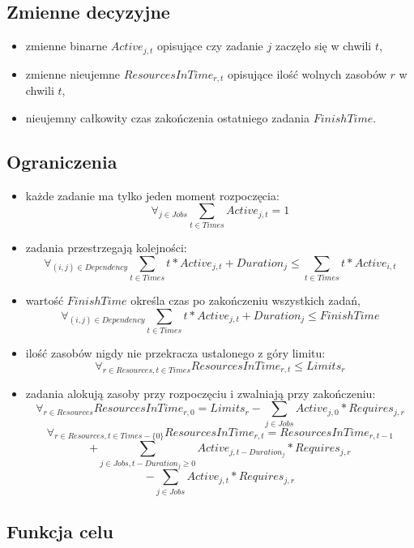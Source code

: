 \documentclass[polish,12pt,titlepage]{article}
\begin{document}
\subsection{Zmienne decyzyjne}

\begin{itemize}
	\item zmienne binarne $Active_{j,t}$ opisujące czy zadanie $j$ zaczęło się w chwili $t$,
	\item zmienne nieujemne $ResourcesInTime_{r,t}$ opisujące ilość wolnych zasobów $r$ w chwili $t$,
	\item nieujemny całkowity czas zakończenia ostatniego zadania $FinishTime$.
\end{itemize}

\subsection{Ograniczenia}

\begin{itemize}
	\item każde zadanie ma tylko jeden moment rozpoczęcia:
	$$\forall_{j \in Jobs} \sum\limits_{t \in Times} Active_{j,t} = 1$$
	\item zadania przestrzegają kolejności:
	$$\forall_{(i,j) \in Dependency} \sum\limits_{t \in Times} t*Active_{j,t}  + Duration_j \leq \sum\limits_{t \in Times} t*Active_{i,t}$$
	\item wartość $FinishTime$ określa czas po zakończeniu wszystkich zadań,
	$$\forall_{(i,j) \in Dependency} \sum\limits_{t \in Times} t*Active_{j,t}  + Duration_j \leq FinishTime$$
	\item ilość zasobów nigdy nie przekracza ustalonego z góry limitu:
	$$\forall_{r \in Resources, t \in Times} ResourcesInTime_{r,t} \leq Limits_r$$
	\item zadania alokują zasoby przy rozpoczęciu i zwalniają przy zakończeniu:
	$$\forall_{r \in Resources} ResourcesInTime_{r,0} = Limits_r - \sum\limits_{j \in Jobs} Active_{j,0} * Requires_{j,r}$$
	$$\forall_{r \in Resources, t \in Times-\{0\}} ResourcesInTime_{r,t} = ResourcesInTime_{r,t-1}$$
	$$ + \sum\limits_{j \in Jobs, t-Duration_j \geq 0} Active_{j,t-Duration_j} * Requires_{j,r}$$
	$$ - \sum\limits_{j \in Jobs} Active_{j,t} * Requires_{j,r}$$
\end{itemize}

\subsection{Funkcja celu}
\end{document}
